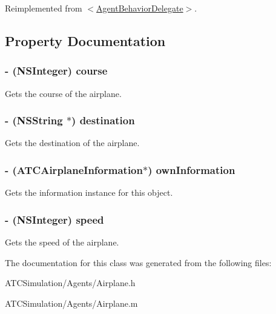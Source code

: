 \-Reimplemented from \hyperlink{protocol_agent_behavior_delegate-p_a9177a82f871c00aa7513cbf5d0cb8ca5}{$<$\-Agent\-Behavior\-Delegate$>$}.



\subsection{\-Property \-Documentation}
\hypertarget{interface_airplane_ace9b050dac86dbd1ef53425c87e56918}{
\subsubsection[{course}]{\setlength{\rightskip}{0pt plus 5cm}-\/ (\-N\-S\-Integer) course}}
\label{interface_airplane_ace9b050dac86dbd1ef53425c87e56918}
\-Gets the course of the airplane. \hypertarget{interface_airplane_ab52b5148d157f283296221cfe90e6144}{
\subsubsection[{destination}]{\setlength{\rightskip}{0pt plus 5cm}-\/ (\-N\-S\-String $\ast$) destination}}
\label{interface_airplane_ab52b5148d157f283296221cfe90e6144}
\-Gets the destination of the airplane. \hypertarget{interface_airplane_ae7aaedc8e578708c9658b88148015dfb}{
\subsubsection[{own\-Information}]{\setlength{\rightskip}{0pt plus 5cm}-\/ ({\bf \-A\-T\-C\-Airplane\-Information}$\ast$) own\-Information}}
\label{interface_airplane_ae7aaedc8e578708c9658b88148015dfb}
\-Gets the information instance for this object. \hypertarget{interface_airplane_a8dc93028dc827369e6f3d4944afa8ef4}{
\subsubsection[{speed}]{\setlength{\rightskip}{0pt plus 5cm}-\/ (\-N\-S\-Integer) speed}}
\label{interface_airplane_a8dc93028dc827369e6f3d4944afa8ef4}
\-Gets the speed of the airplane. 

\-The documentation for this class was generated from the following files\-:\begin{DoxyCompactItemize}
\item 
\-A\-T\-C\-Simulation/\-Agents/\-Airplane.\-h\item 
\-A\-T\-C\-Simulation/\-Agents/\-Airplane.\-m\end{DoxyCompactItemize}
